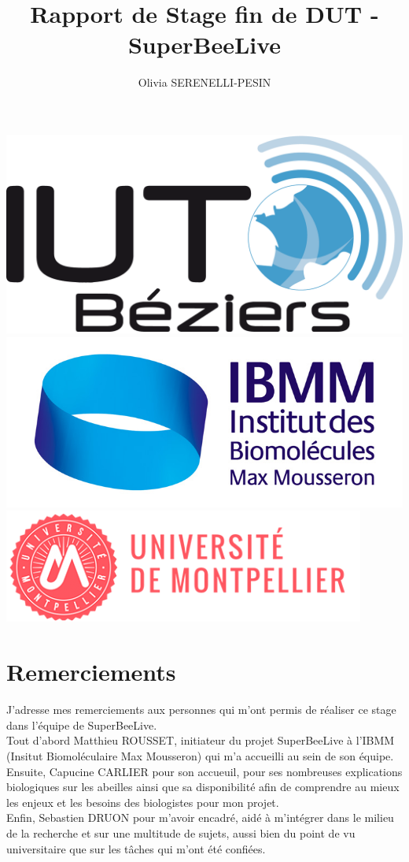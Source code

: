 \documentclass[11pt,french,a4paper]{report}
\title{Rapport de Stage fin de DUT - SuperBeeLive}
\author{Olivia SERENELLI-PESIN}
\begin{document}
\maketitle
\begin{center}
\includegraphics[scale=0.03]{../images/logo/logo_iutbeziers.png}
\includegraphics[scale=0.3]{../images/logo/logoibmm.jpg}
\includegraphics[scale=0.3]{../images/logo/um_logo.png}
\end{center}

\clearpage
\newpage 

\chapter*{Remerciements}

J’adresse mes remerciements aux personnes qui m’ont permis de réaliser ce stage dans l’équipe de SuperBeeLive. \\
Tout d’abord Matthieu ROUSSET, initiateur du projet SuperBeeLive à l'IBMM (Insitut Biomoléculaire Max Mousseron) 
qui m’a accueilli au sein de son équipe. \\
Ensuite, Capucine CARLIER pour son accueuil, pour ses nombreuses explications biologiques sur les abeilles ainsi que sa disponibilité 
afin de comprendre au mieux les enjeux et les besoins des biologistes pour mon projet. \\
Enfin, Sebastien DRUON pour m’avoir encadré, aidé à m’intégrer dans le milieu de la recherche et sur une multitude 
de sujets, aussi bien du point de vu universitaire que sur les tâches qui m’ont été confiées. \\
\end{document}
